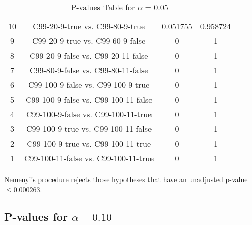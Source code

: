 \documentclass[a4paper,10pt]{article}
\begin{document}
\begin{landscape}
\begin{table}[!htp]
\begin{tabular}{cccc}
10&C99-20-9-true vs. C99-80-9-true&0.051755&0.958724\\
9&C99-20-9-true vs. C99-60-9-false&0&1\\
8&C99-20-9-false vs. C99-20-11-false&0&1\\
7&C99-80-9-false vs. C99-80-11-false&0&1\\
6&C99-100-9-false vs. C99-100-9-true&0&1\\
5&C99-100-9-false vs. C99-100-11-false&0&1\\
4&C99-100-9-false vs. C99-100-11-true&0&1\\
3&C99-100-9-true vs. C99-100-11-false&0&1\\
2&C99-100-9-true vs. C99-100-11-true&0&1\\
1&C99-100-11-false vs. C99-100-11-true&0&1\\
\hline
\end{tabular}
\caption{P-values Table for $\alpha=0.05$}
\end{table}Nemenyi's procedure rejects those hypotheses that have an unadjusted p-value $\le0.000263$.

\pagebreak

\subsection{P-values for $\alpha=0.10$}


\end{landscape}
\end{document}
